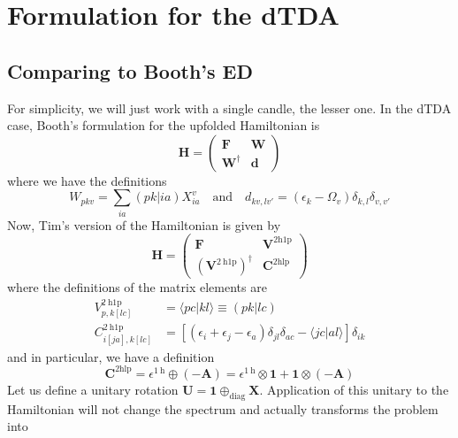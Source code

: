 \section{Formulation for the dTDA}
\subsection{Comparing to Booth's ED}
For simplicity, we will just work with a single candle, the lesser one. In the dTDA case, Booth's formulation for the upfolded Hamiltonian is
\begin{equation}
    \bm{H} = \begin{pmatrix} \bm{F} & \bm{W} \\ \bm{W}^{\dagger} & \bm{d} \end{pmatrix}
\label{eq:booth_hamiltonian}
\end{equation}
where we have the definitions
\begin{equation}
    W_{pkv} = \sum_{ia} (pk|ia) X_{ia}^{v} \quad \text{and} \quad d_{kv,lv'} = \left(\epsilon_k - \Omega_v\right) \delta_{k,l} \delta_{v,v'}
\label{eq:booth_definitions}
\end{equation}
Now, Tim's version of the Hamiltonian is given by
\begin{equation}
    \bm{H} = \begin{pmatrix} \bm{F} & \bm{V}^{2 \mathrm{h1p}}\\ \left(\bm{V}^{2 \mathrm{~h} 1 \mathrm{p}}\right)^{\dagger} & \bm{C}^{2 \mathrm{hlp}} \end{pmatrix}
\label{eq:tim_hamiltonian}
\end{equation}
where the definitions of the matrix elements are
\begin{align}
    V_{p, k[l c]}^{2 \mathrm{~h} 1 \mathrm{p}} &= \langle p c | k l \rangle \equiv (pk|lc) \\
    C_{i[j a], k[l c]}^{2 \mathrm{~h} 1 \mathrm{p}} &= \left[\left(\epsilon_i+\epsilon_j-\epsilon_a\right) \delta_{j l} \delta_{a c}-\langle j c | a l \rangle\right] \delta_{i k}
\end{align}
and in particular, we have a definition 
\begin{equation}
    \bm{C}^{2 \mathrm{hlp}} = \epsilon^{1 \mathrm{~h}} \oplus (-\bm{A}) = \epsilon^{1 \mathrm{~h}} \otimes \bm{1} + \bm{1} \otimes (-\bm{A})
\label{eq:tim_c_hlp}
\end{equation}
Let us define a unitary rotation $\bm{U} = \bm{1} \oplus_{\text{diag}} \bm{X}$. Application of this unitary to the Hamiltonian will not change the spectrum and actually transforms the problem into
